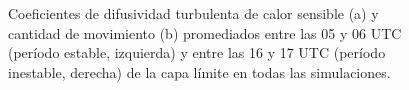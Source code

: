 \documentclass[12pt,spanish,oneside, a4paper]{book}
\begin{document}
\begin{figure}

{\centering {}\newline{}\newline{}

}

\caption{Coeficientes de difusividad turbulenta de calor sensible (a) y cantidad de movimiento (b) promediados entre las 05 y 06 UTC (período estable, izquierda) y entre las 16 y 17 UTC (período inestable, derecha) de la capa límite en todas las simulaciones.  \label{k-ulke-wrf}}\label{fig:k_ulke_wrf}
\end{figure}
\end{document}
